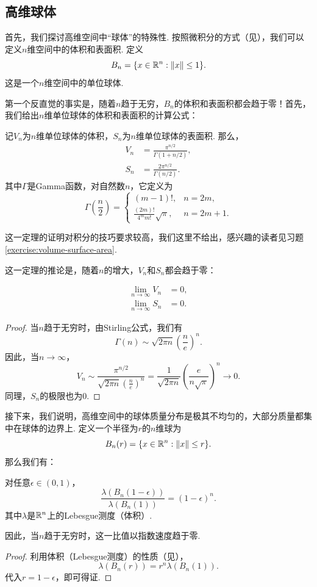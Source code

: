 \subsection{高维球体}
首先，我们探讨高维空间中“球体”的特殊性. 按照微积分的方式（见），我们可以定义$n$维空间中的体积和表面积. 定义
\[B_n = \{x \in \mathbb{R}^n: \left\|x\right\| \leq 1\}.\]
这是一个$n$维空间中的单位球体. 

第一个反直觉的事实是，随着$n$趋于无穷，$B_n$的体积和表面积都会趋于零！首先，我们给出$n$维单位球体的体积和表面积的计算公式：

\begin{theorem}\label{thm:volume-surface-area}
记$V_n$为$n$维单位球体的体积，$S_n$为$n$维单位球体的表面积. 那么，
\begin{align*}
    V_n&=\frac{\pi^{n/2}}{\Gamma(1+n/2)},\\
    S_n&=\frac{2\pi^{n/2}}{\Gamma(n/2)}.
\end{align*}
其中$\Gamma$是Gamma函数，对自然数$n$，它定义为
\[\Gamma\left(\frac{n}{2}\right)=\begin{cases}
    (m-1)!, & n=2m,\\
    \frac{(2m)!}{4^mm!}\sqrt{\pi}, & n=2m+1.
\end{cases}
\]
\end{theorem}
这一定理的证明对积分的技巧要求较高，我们这里不给出，感兴趣的读者见习题 \ref{exercise:volume-surface-area}.

这一定理的推论是，随着$n$的增大，$V_n$和$S_n$都会趋于零：

\begin{corollary}
\begin{align*}
    \lim_{n\to\infty} V_n&=0,\\
    \lim_{n\to\infty} S_n&=0.
\end{align*}
\end{corollary}
\begin{proof}
    当$n$趋于无穷时，由Stirling公式，我们有
        \[\Gamma(n)\sim\sqrt{2\pi n}\left(\frac{n}{e}\right)^n.\]
    因此，当$n\to\infty$，
    \[V_n\sim\frac{\pi^{n/2}}{\sqrt{2\pi n}\left(\frac{n}{e}\right)^n}=\frac{1}{\sqrt{2\pi n}}\left(\frac{e}{n\sqrt{\pi}}\right)^n\to 0.\]
    同理，$S_n$的极限也为$0$.
\end{proof}

接下来，我们说明，高维空间中的球体质量分布是极其不均匀的，大部分质量都集中在球体的边界上. 定义一个半径为$r$的$n$维球为
\[B_n(r) = \{x \in \mathbb{R}^n: \left\|x\right\| \leq r\}.\]
那么我们有：
\begin{proposition}
对任意$\epsilon\in(0,1)$，
\[\frac{\lambda(B_n(1-\epsilon))}{\lambda(B_n(1))}=(1-\epsilon)^n.\]
其中$\lambda$是$\mathbb{R}^n$上的Lebesgue测度（体积）. 

因此，当$n$趋于无穷时，这一比值以指数速度趋于零. 
\end{proposition}
\begin{proof}
    利用体积（Lebesgue测度）的性质（见），
    \[\lambda(B_n(r))=r^n\lambda(B_n(1)).\]
    代入$r=1-\epsilon$，即可得证.
\end{proof}

